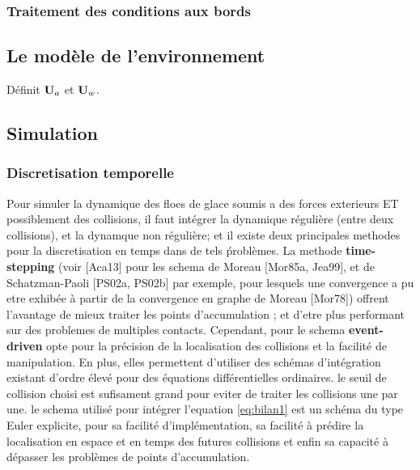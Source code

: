 \subsubsection{Traitement des conditions aux bords}

\subsection{Le modèle de l'environnement}
Définit $\bm{\mathrm{U}}_a$ et $\bm{\mathrm{U}}_w$. 

\subsection{Simulation}
 
\subsubsection{Discretisation temporelle}

Pour simuler la dynamique des floes de glace soumis a des forces exterieurs ET possiblement des collisions, il faut intégrer la dynamique régulière (entre deux collisions), et la dynamque non régulière; et il existe deux principales methodes pour la discretisation en temps dans de tels ṕroblèmes. La methode \textbf{time-stepping} (voir [Aca13] pour les schema de Moreau [Mor85a, Jea99], et de Schatzman-Paoli [PS02a, PS02b] par exemple, pour lesquels une convergence a pu etre exhibée à partir de la convergence en graphe de Moreau [Mor78]) offrent l'avantage de mieux traiter les points d'accumulation \parencite{rabatel2015thesis}; et d'etre plus performant sur des problemes de multiples contacts. Cependant, \citeauthor{rabatel2015thesis} pour le schema \textbf{event-driven} opte pour la précision de la localisation des collisions et la facilité de manipulation. En plus, elles permettent d’utiliser des schémas d’intégration existant d’ordre élevé pour des équations différentielles ordinaires. le seuil de collision choisi est sufisament grand pour eviter de traiter les collisions une par une. le schema utilisé pour intégrer l'equation \cref{eq:bilan1} est un schéma du type Euler explicite, pour sa facilité d’implémentation, sa facilité à prédire la localisation en espace et en temps des futures collisions et enfin sa capacité à dépasser les problèmes de points d’accumulation. 

